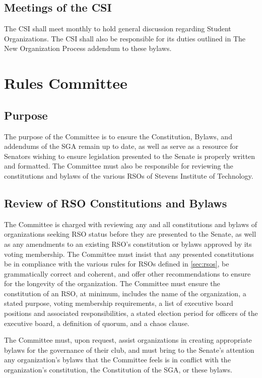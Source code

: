 \documentclass[12pt]{scrreprt}
\begin{document}
\subsection{Meetings of the CSI}
The CSI shall meet monthly to hold general discussion regarding Student Organizations.
The CSI shall also be responsible for its duties outlined in The New Organization Process
addendum to these bylaws.

\section{Rules Committee}

\subsection{Purpose}
The purpose of the Committee is to ensure the Constitution, Bylaws, and addendums of the SGA remain up
to date, as well as serve as a resource for Senators wishing to ensure legislation presented to the Senate is properly written and formatted. The Committee must also be responsible for reviewing the constitutions and bylaws of the various RSOs of Stevens Institute of Technology.

\subsection{Review of RSO Constitutions and Bylaws}
The Committee is charged with reviewing any and all constitutions and bylaws of organizations seeking RSO status before they are presented to the Senate, as well as any amendments to an existing RSO’s constitution or bylaws approved by its voting membership. The Committee must insist that any presented constitutions be in compliance with the various rules for RSOs defined in 
\ref{sec:rsos}, be grammatically correct and coherent, and offer other recommendations to ensure for the longevity of the organization. The Committee must ensure the constitution of an RSO, at minimum, includes the name of the organization, a stated purpose, voting membership requirements, a list of executive board positions and associated responsibilities, a stated election period for officers of the executive board, a definition of quorum, and a chaos clause.

The Committee must, upon request, assist organizations in creating appropriate bylaws for the governance of their club, and must bring to the Senate's attention any organization's bylaws
that the Committee feels is in conflict with the organization's constitution, the Constitution of
the SGA, or these bylaws.
\end{document}
